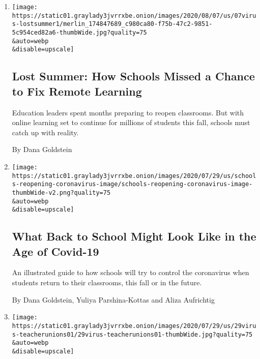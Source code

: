\begin{enumerate}
\def\labelenumi{\arabic{enumi}.}
\item
  \href{/2020/08/07/us/remote-learning-fall-2020.html}{}

  \texttt{[image: https://static01.graylady3jvrrxbe.onion/images/2020/08/07/us/07virus-lostsummer1/merlin\_174847689\_c980ca80-f75b-47c2-9851-5c954ced82a6-thumbWide.jpg?quality=75\\\&auto=webp\\\&disable=upscale]}

  \hypertarget{lost-summer-how-schools-missed-a-chance-to-fix-remote-learning}{%
  \subsection{Lost Summer: How Schools Missed a Chance to Fix Remote
  Learning}\label{lost-summer-how-schools-missed-a-chance-to-fix-remote-learning}}

  Education leaders spent months preparing to reopen classrooms. But
  with online learning set to continue for millions of students this
  fall, schools must catch up with reality.

  By Dana Goldstein
\item
  \href{/interactive/2020/07/29/us/schools-reopening-coronavirus.html}{}

  \texttt{[image: https://static01.graylady3jvrrxbe.onion/images/2020/07/29/us/schools-reopening-coronavirus-image/schools-reopening-coronavirus-image-thumbWide-v2.png?quality=75\\\&auto=webp\\\&disable=upscale]}

  \hypertarget{what-back-to-school-might-look-like-in-the-age-of-covid-19}{%
  \subsection{What Back to School Might Look Like in the Age of
  Covid-19}\label{what-back-to-school-might-look-like-in-the-age-of-covid-19}}

  An illustrated guide to how schools will try to control the
  coronavirus when students return to their classrooms, this fall or in
  the future.

  By Dana Goldstein, Yuliya Parshina-Kottas and Aliza Aufrichtig
\item
  \href{/2020/07/29/us/teacher-union-school-reopening-coronavirus.html}{}

  \texttt{[image: https://static01.graylady3jvrrxbe.onion/images/2020/07/29/us/29virus-teacherunions01/29virus-teacherunions01-thumbWide.jpg?quality=75\\\&auto=webp\\\&disable=upscale]}


\end{enumerate}
